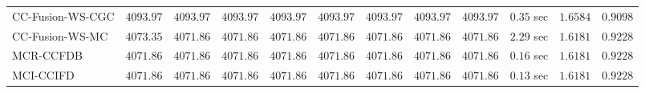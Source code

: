 \begin{table}[H]
\begin{tabular}{lrrrrrrrrrrr}
    CC-Fusion-WS-CGC & $      4093.97$ & $      4093.97$ & $      4093.97$ & $      4093.97$ & $      4093.97$ & $      4093.97$ & $      4093.97$ & $      4093.97$ & $         0.35$ sec    & $       1.6584$  & $       0.9098$ \\ 
     CC-Fusion-WS-MC & $      4073.35$ & $      4071.86$ & $      4071.86$ & $      4071.86$ & $      4071.86$ & $      4071.86$ & $      4071.86$ & $      4071.86$ & $         2.29$ sec    & $       1.6181$  & $       0.9228$ \\ 
\cmidrule{1-1} 
           MCR-CCFDB & $      4071.86$ & $      4071.86$ & $      4071.86$ & $      4071.86$ & $      4071.86$ & $      4071.86$ & $      4071.86$ & $      4071.86$ & $         0.16$ sec    & $       1.6181$  & $       0.9228$ \\ 
\cmidrule{1-1} 
           MCI-CCIFD & $      4071.86$ & $      4071.86$ & $      4071.86$ & $      4071.86$ & $      4071.86$ & $      4071.86$ & $      4071.86$ & $      4071.86$ & $         0.13$ sec    & $       1.6181$  & $       0.9228$ \\ 
\bottomrule
\end{tabular}
\end{table}


